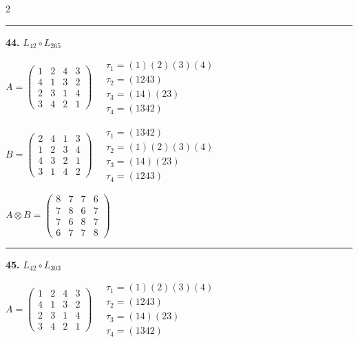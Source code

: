 \begin{multicols}{2}
\vspace{0.3em}
\hrule
\vspace{0.3em}

\noindent\textbf{44.} $L_{42} \circ L_{265}$

$A = \begin{pmatrix} 1 & 2 & 4 & 3 \\ 4 & 1 & 3 & 2 \\ 2 & 3 & 1 & 4 \\ 3 & 4 & 2 & 1 \end{pmatrix} \quad \begin{matrix} \tau_{1}=(1)(2)(3)(4) \\ \tau_{2}=(1 2 4 3) \\ \tau_{3}=(1 4)(2 3) \\ \tau_{4}=(1 3 4 2) \end{matrix}$

$B = \begin{pmatrix} 2 & 4 & 1 & 3 \\ 1 & 2 & 3 & 4 \\ 4 & 3 & 2 & 1 \\ 3 & 1 & 4 & 2 \end{pmatrix} \quad \begin{matrix} \tau_{1}=(1 3 4 2) \\ \tau_{2}=(1)(2)(3)(4) \\ \tau_{3}=(1 4)(2 3) \\ \tau_{4}=(1 2 4 3) \end{matrix}$

$A \otimes B = \begin{pmatrix} 8 & 7 & 7 & 6 \\ 7 & 8 & 6 & 7 \\ 7 & 6 & 8 & 7 \\ 6 & 7 & 7 & 8 \end{pmatrix}$

\vspace{0.3em}
\hrule
\vspace{0.3em}

\noindent\textbf{45.} $L_{42} \circ L_{303}$

$A = \begin{pmatrix} 1 & 2 & 4 & 3 \\ 4 & 1 & 3 & 2 \\ 2 & 3 & 1 & 4 \\ 3 & 4 & 2 & 1 \end{pmatrix} \quad \begin{matrix} \tau_{1}=(1)(2)(3)(4) \\ \tau_{2}=(1 2 4 3) \\ \tau_{3}=(1 4)(2 3) \\ \tau_{4}=(1 3 4 2) \end{matrix}$


\end{multicols}
